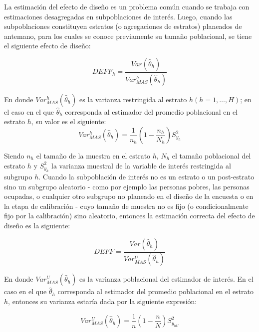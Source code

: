 \documentclass[12pt,spanish,]{book}
\begin{document}
La estimación del efecto de diseño es un problema común cuando se trabaja con estimaciones desagregadas en subpoblaciones de interés. Luego, cuando las subpoblaciones constituyen estratos (o agregaciones de estratos) planeados de antemano, para los cuales se conoce previamente su tamaño poblacional, se tiene el siguiente efecto de diseño:

\[
DEFF_h= \frac{Var (\hat\theta_h) }{Var_{MAS}^h(\hat\theta_h) }
\]

En donde \(Var_{MAS}^h(\hat\theta_h)\) es la varianza restringida al estrato \(h (h=1,\ldots, H)\); en el caso en el que \(\hat\theta_h\) corresponda al estimador del promedio poblacional en el estrato \(h\), su valor es el siguiente:
\[
Var_{MAS}^h(\hat\theta_h)=\frac{1}{n_h}\left(1-\frac{n_h}{N_h}\right)S_{y_h}^2
\]

Siendo \(n_h\) el tamaño de la muestra en el estrato \(h\), \(N_h\) el tamaño poblacional del estrato \(h\) y \(S_{y_h}^2\) la varianza muestral de la variable de interés restringida al subgrupo \(h\). Cuando la subpoblación de interés no es un estrato o un post-estrato sino un subgrupo aleatorio - como por ejemplo las personas pobres, las personas ocupadas, o cualquier otro subgrupo no planeado en el diseño de la encuesta o en la etapa de calibración - cuyo tamaño de muestra no es fijo (o condicionalmente fijo por la calibración) sino aleatorio, entonces la estimación correcta del efecto de diseño es la siguiente:

\[
DEFF= \frac{Var (\hat\theta_h) }{Var_{MAS}^U(\hat\theta_h) }
\]

En donde \(Var_{MAS}^U(\hat\theta_h)\) es la varianza poblacional del estimador de interés. En el caso en el que \(\hat\theta_h\) corresponda al estimador del promedio poblacional en el estrato \(h\), entonces su varianza estaría dada por la siguiente expresión:

\[
Var_{MAS}^U(\hat\theta_h)=\frac{1}{n}\left(1-\frac{n}{N}\right)S_{y_{hU}}^2
\]
\end{document}
